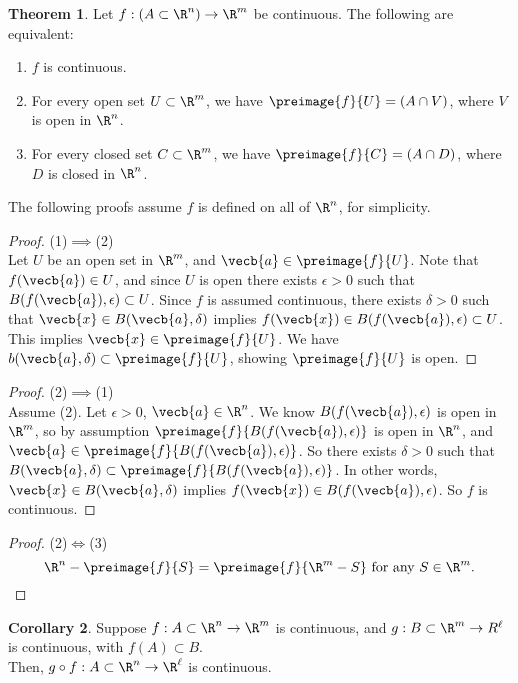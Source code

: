 \documentclass[a5paper]{article}
\theoremstyle{definition}%
\newtheorem{theorem}{Theorem}
\newtheorem{corollary}[theorem]{Corollary}
\numberwithin{exercise}{section}
\theoremstyle{remark}%
\begin{document}
\begin{highlight}
\begin{theorem}
Let $f:(A\subset\R^n)\to\R^m$ be continuous. The following are equivalent:
\begin{enumerate}
\item $f$ is continuous.
\item For every open set $U\subset \R^m$, we have $\preimage{f}{U}=(A\cap V)$, where $V$ is open in $\R^n$. 
\item For every closed set $C\subset \R^m$, we have $\preimage{f}{C}=(A\cap D)$, where $D$ is closed in $\R^n$.
\end{enumerate}
\end{theorem}
\end{highlight}
The following proofs assume $f$ is defined on all of $\R^n$, for simplicity. 
\begin{proof}(1)$\implies$(2)\\
Let $U$ be an open set in $\R^m$, and $\vecb{a}\in \preimage{f}{U}$. Note that $f(\vecb{a})\in U$, and since $U$ is open there exists $\epsilon>0$ such that $B(f(\vecb{a}),\epsilon)\subset U$. Since $f$ is assumed continuous, there exists $\delta>0$ such that $\vecb{x}\in B(\vecb{a},\delta)$ implies $f(\vecb{x})\in B(f(\vecb{a}), \epsilon)\subset U$. This implies $\vecb{x}\in \preimage{f}{U}$. We have $b(\vecb{a}, \delta)\subset \preimage{f}{U}$, showing $\preimage{f}{U}$ is open. 
\end{proof}
\begin{proof}(2)$\implies$(1)\\
Assume (2). Let $\epsilon>0$, $\vecb{a}\in \R^n$. We know $B(f(\vecb{a}),\epsilon)$ is open in $\R^m$, so by assumption	$\preimage{f}{B(f(\vecb{a}),\epsilon)}$ is open in $\R^n$, and $\vecb{a}\in \preimage{f}{B(f(\vecb{a}),\epsilon)}$. So there exists $\delta>0$ such that $B(\vecb{a},\delta)\subset \preimage{f}{B(f(\vecb{a}),\epsilon)}$. In other words, $\vecb{x}\in B(\vecb{a}, \delta)$ implies $f(\vecb{x})\in B(f(\vecb{a}),\epsilon)$. So $f$ is continuous. 
\end{proof}
\begin{proof}(2)$\iff$(3)\\
$$\R^n-\preimage{f}{S}=\preimage{f}{\R^m-S} \text{ for any } S\in \R^m.$$
\end{proof}

\begin{highlight}
\begin{corollary}
Suppose $f:A\subset \R^n\to\R^m$ is continuous, and $g:B\subset \R^m\to R^\ell$ is continuous, with $f(A)\subset B$. \\
Then, $g\circ f:A\subset \R^n\to\R^\ell$ is continuous. 
\end{corollary}
\end{highlight}
\end{document}
